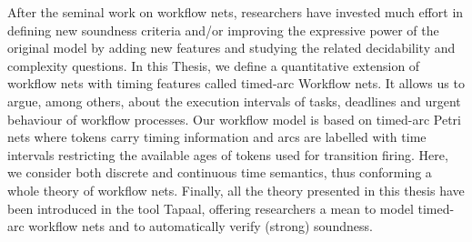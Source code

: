 After the seminal work on workflow nets, researchers have 
invested much effort in defining new soundness criteria and/or 
improving the expressive power of the original model by adding new features 
and studying the related decidability and 
complexity questions.
In this Thesis, we define a quantitative extension of workflow 
nets with timing features called timed-arc Workflow nets. It allows us to argue, among others, 
about the execution intervals of tasks, deadlines and urgent behaviour of workflow processes. Our workflow
model is based on timed-arc Petri nets
where tokens carry timing information
and arcs are labelled with time intervals restricting the available
ages of tokens used for transition firing. Here, we consider both discrete and continuous time
semantics, thus conforming a whole theory of workflow nets. Finally, all the theory presented in 
this thesis have been introduced in the tool Tapaal, offering researchers a mean to model 
timed-arc workflow nets and to automatically verify (strong) soundness.

